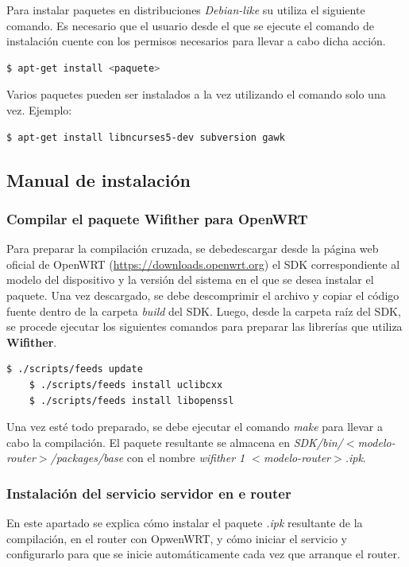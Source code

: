 \documentclass[12pt, twoside]{article}
\begin{document}
        Para instalar paquetes en distribuciones \textit{Debian-like} su utiliza el siguiente comando.
        Es necesario que el usuario desde el que se ejecute el comando de instalación cuente con los permisos necesarios para llevar a cabo dicha acción.

        \begin{lstlisting}[language=bash]
    $ apt-get install <paquete>
        \end{lstlisting}

        Varios paquetes pueden ser instalados a la vez utilizando el comando solo una vez.
        Ejemplo:

        \begin{lstlisting}[language=bash]
    $ apt-get install libncurses5-dev subversion gawk
        \end{lstlisting}

    \subsection{Manual de instalación}
        \subsubsection{Compilar el paquete Wifither para OpenWRT}
            Para preparar la compilación cruzada, se debedescargar desde la página web oficial de OpenWRT (\url{https://downloads.openwrt.org}) el SDK correspondiente al modelo del dispositivo y la versión del sistema en el que se desea instalar el paquete. Una vez descargado, se debe descomprimir el archivo y copiar el código fuente dentro de la carpeta \textit{build} del SDK. Luego, desde la carpeta raíz del SDK, se procede ejecutar los siguientes comandos para preparar las librerías que utiliza \textbf{Wifither}.

            \begin{lstlisting}[language=bash]
    $ ./scripts/feeds update
    $ ./scripts/feeds install uclibcxx
    $ ./scripts/feeds install libopenssl
            \end{lstlisting}

            Una vez esté todo preparado, se debe ejecutar el comando \textit{make} para llevar a cabo la compilación. El paquete resultante se almacena en \textit{SDK/bin/$<$modelo-router$>$/packages/base} con el nombre \textit{wifither 1 $<$modelo-router$>$.ipk}.


        \subsubsection{Instalación del servicio servidor en e router}
            En este apartado se explica cómo instalar el paquete \textit{.ipk} resultante de la compilación, en el router con OpwenWRT, y cómo iniciar el servicio y configurarlo para que se inicie automáticamente cada vez que arranque el router.
\end{document}
